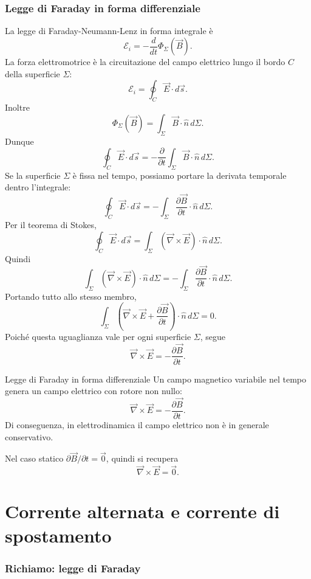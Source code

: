 \documentclass[a4paper]{article}
\begin{document}
\section{Legge di Faraday in forma differenziale}

La legge di Faraday-Neumann-Lenz in forma integrale è
\[
\mathcal{E}_i=-\frac{d}{dt}\Phi_\Sigma(\vec{B}).
\]
La forza elettromotrice è la circuitazione del campo elettrico lungo il bordo \(C\) della superficie \(\Sigma\):
\[
\mathcal{E}_i=\oint_C \vec{E}\cdot d\vec{s}.
\]
Inoltre
\[
\Phi_\Sigma(\vec{B})=\int_\Sigma \vec{B}\cdot\hat{n}\,d\Sigma.
\]
Dunque
\[
\oint_C \vec{E}\cdot d\vec{s}
=-\frac{\partial}{\partial t}\int_\Sigma \vec{B}\cdot\hat{n}\,d\Sigma.
\]
Se la superficie \(\Sigma\) è fissa nel tempo, possiamo portare la derivata temporale dentro l'integrale:
\[
\oint_C \vec{E}\cdot d\vec{s}
=-\int_\Sigma \frac{\partial\vec{B}}{\partial t}\cdot\hat{n}\,d\Sigma.
\]
Per il teorema di Stokes,
\[
\oint_C \vec{E}\cdot d\vec{s}
=\int_\Sigma \left(\vec{\nabla}\times\vec{E}\right)\cdot\hat{n}\,d\Sigma.
\]
Quindi
\[
\int_\Sigma \left(\vec{\nabla}\times\vec{E}\right)\cdot\hat{n}\,d\Sigma
=-\int_\Sigma \frac{\partial\vec{B}}{\partial t}\cdot\hat{n}\,d\Sigma.
\]
Portando tutto allo stesso membro,
\[
\int_\Sigma \left(\vec{\nabla}\times\vec{E}+\frac{\partial\vec{B}}{\partial t}\right)\cdot\hat{n}\,d\Sigma=0.
\]
Poiché questa uguaglianza vale per ogni superficie \(\Sigma\), segue
\[
\vec{\nabla}\times\vec{E}=-\frac{\partial\vec{B}}{\partial t}.
\]

\begin{snippettheorem}{Legge di Faraday in forma differenziale}
Un campo magnetico variabile nel tempo genera un campo elettrico con rotore non nullo:
\[
    \vec{\nabla}\times\vec{E}=-\frac{\partial\vec{B}}{\partial t}.
\]
Di conseguenza, in elettrodinamica il campo elettrico non è in generale conservativo.
\end{snippettheorem}

Nel caso statico \(\partial\vec{B}/\partial t=\vec{0}\), quindi si recupera
\[
\vec{\nabla}\times\vec{E}=\vec{0}.
\]

\pagebreak
\part{Corrente alternata e corrente di spostamento}

\section{Richiamo: legge di Faraday}
\end{document}
